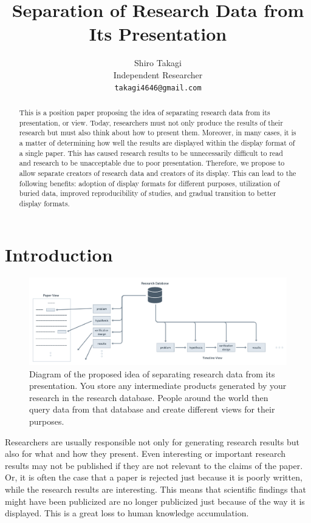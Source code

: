 \documentclass{article}
\title{Separation of Research Data from Its Presentation}
\author{%
  Shiro Takagi \\
  Independent Researcher\\
  \texttt{takagi4646@gmail.com} \\
}
\begin{document}
\maketitle


\begin{abstract}
  This is a position paper proposing the idea of separating research data from its presentation, or view. Today, researchers must not only produce the results of their research but must also think about how to present them. Moreover, in many cases, it is a matter of determining how well the results are displayed within the display format of a single paper. This has caused research results to be unnecessarily difficult to read and research to be unacceptable due to poor presentation. Therefore, we propose to allow separate creators of research data and creators of its display. This can lead to the following benefits: adoption of display formats for different purposes, utilization of buried data, improved reproducibility of studies, and gradual transition to better display formats.
\end{abstract}


\section{Introduction}

\begin{figure}[htb]
    \centering
    \includegraphics[width=\linewidth]{figs/paper_as_a_view.png}
    \caption{Diagram of the proposed idea of separating research data from its presentation. You store any intermediate products generated by your research in the research database. People around the world then query data from that database and create different views for their purposes.}
    \label{fig:paper_as_a_view}
\end{figure}

Researchers are usually responsible not only for generating research results but also for what and how they present. Even interesting or important research results may not be published if they are not relevant to the claims of the paper. Or, it is often the case that a paper is rejected just because it is poorly written, while the research results are interesting. This means that scientific findings that might have been publicized are no longer publicized just because of the way it is displayed. This is a great loss to human knowledge accumulation.
\end{document}
